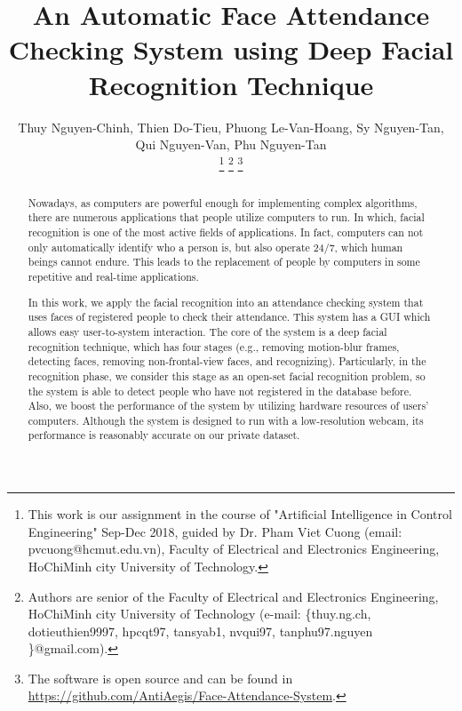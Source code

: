 \documentclass[journal, twocolumn]{IEEEtran}
\begin{document}
\title{An Automatic Face Attendance Checking System using Deep Facial Recognition Technique}


\author{Thuy Nguyen-Chinh,
		Thien Do-Tieu,
		Phuong Le-Van-Hoang,
		Sy Nguyen-Tan,
		Qui Nguyen-Van,
		Phu Nguyen-Tan

\thanks{This work is our assignment in the course of "Artificial Intelligence in Control Engineering" Sep-Dec 2018, guided by Dr. Pham Viet Cuong (email: pvcuong@hcmut.edu.vn), Faculty of Electrical and Electronics Engineering, HoChiMinh city University of Technology.}
\thanks{Authors are senior of the Faculty of Electrical and Electronics Engineering, HoChiMinh city University of Technology (e-mail: \{thuy.ng.ch, dotieuthien9997, hpcqt97, tansyab1, nvqui97, tanphu97.nguyen \}@gmail.com).}
\thanks{The software is open source and can be found in \url{https://github.com/AntiAegis/Face-Attendance-System}.}
}


\maketitle


\begin{abstract}
Nowadays, as computers are powerful enough for implementing complex algorithms, there are numerous applications that people utilize computers to run. In which, facial recognition is one of the most active fields of applications. In fact, computers can not only automatically identify who a person is, but also operate 24/7, which human beings cannot endure. This leads to the replacement of people by computers in some repetitive and real-time applications.

In this work, we apply the facial recognition into an attendance checking system that uses faces of registered people to check their attendance. This system has a GUI which allows easy user-to-system interaction. The core of the system is a deep facial recognition technique, which has four stages (e.g., removing motion-blur frames, detecting faces, removing non-frontal-view faces, and recognizing). Particularly, in the recognition phase, we consider this stage as an open-set facial recognition problem, so the system is able to detect people who have not registered in the database before. Also, we boost the performance of the system by utilizing hardware resources of users' computers. Although the system is designed to run with a low-resolution webcam, its performance is reasonably accurate on our private dataset.
\end{abstract}
\end{document}
